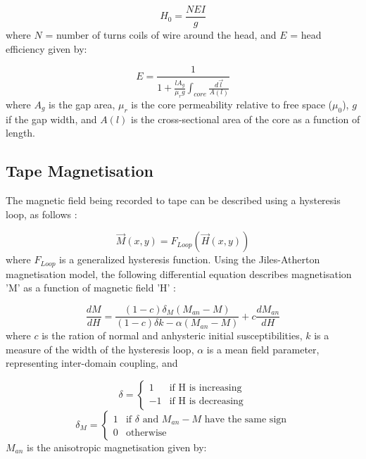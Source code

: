 \documentclass[twoside,a4paper]{article}
\begin{document}
\begin{equation}
    H_0 = \frac{NEI}{g}
\end{equation}
%
where $N$ = number of turns coils of wire around the head, and $E$ = head 
efficiency given by:

\begin{equation}
    E = \frac{1}{1 + \frac{l  A_g}{\mu_r g} \int_{core} \frac {d \vec{l}}{A(l)}}
\end{equation}
%
where $A_g$ is the gap area, $\mu_r$ is the core permeability relative to 
free space ($\mu_0$), $g$ if the gap width, and $A(l)$ is the cross-sectional 
area of the core as a function of length.

\subsection{Tape Magnetisation}
The magnetic field being recorded to tape can be described using 
a hysteresis loop, as follows \cite{1994tmr..book.....B}:

\begin{equation}
    \vec{M}(x,y) = F_{Loop}(\vec{H}(x,y))
\end{equation}
%
where $F_{Loop}$ is a generalized hysteresis function.
\newline\newline
Using the Jiles-Atherton magnetisation model, the following
differential equation describes magnetisation 'M' as a function 
of magnetic field 'H' \cite{Hysteresis}:

\begin{equation}
    \frac{dM}{dH} = \frac{(1-c) \delta_M (M_{an} - M)}{(1-c) \delta k - \alpha (M_{an} - M)} + c \frac{dM_{an}}{dH}
    \label{eq5}
\end{equation}
%
where $c$ is the ration of normal and anhysteric initial susceptibilities,
$k$ is a measure of the width of the hysteresis
loop, $\alpha$ is a mean field parameter, representing inter-domain
coupling, and

\begin{equation}
    \delta = \begin{cases}
        1 & \text{if H is increasing} \\
        -1 & \text{if H is decreasing}
    \end{cases}
\end{equation}
\begin{equation}
    \delta_M = \begin{cases}
        1 & \text{if $\delta$ and $M_{an} - M$ have the same sign} \\
        0 & \text{otherwise}
    \end{cases}
\end{equation}
%
$M_{an}$ is the anisotropic magnetisation given by:
\end{document}
